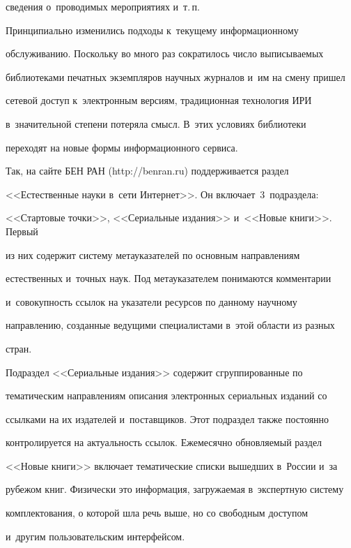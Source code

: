 сведения о~проводимых мероприятиях и~т.\,п. 


  


  Принципиально изменились подходы к~текущему информационному 


обслуживанию. Поскольку во много раз сократилось число выписываемых 


библиотеками печатных экземпляров научных журналов и~им на смену пришел 


сетевой доступ к~электронным версиям, традиционная технология ИРИ 


в~значительной степени потеряла смысл. В~этих условиях библиотеки 


переходят на новые формы информационного сервиса. 


  


  Так, на сайте БЕН РАН ({\sf http://benran.ru}) поддерживается раздел 


<<Естественные науки в~сети Интернет>>. Он включает~3~подраздела: 


<<Стартовые точки>>, <<Сериальные издания>> и~<<Новые книги>>. Первый 


из них содержит систему метауказателей по основным направлениям 


естественных и~точных наук. Под метауказателем понимаются комментарии 


и~совокупность ссылок на указатели ресурсов по данному научному 


направлению, созданные ведущими специалистами в~этой области из разных 


стран. 


  


  Подраздел <<Сериальные издания>> содержит сгруппированные по 


тематическим направлениям описания электронных сериальных изданий со 


ссылками на их издателей и~поставщиков. Этот подраздел также постоянно 


контролируется на актуальность ссылок. Ежемесячно обновляемый раздел 


<<Новые книги>> включает тематические списки вышедших в~России и~за 


рубежом книг. Физически это информация, загружаемая в~экспертную систему 


комплектования, о которой шла речь выше, но со свободным доступом 


и~другим пользовательским интерфейсом. 


